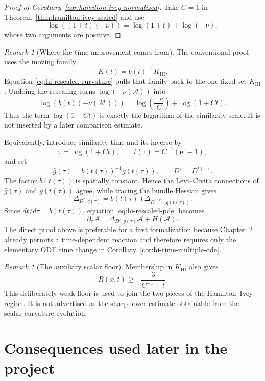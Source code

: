 \documentclass[10pt]{coll-l}
\theoremstyle{definition}
\theoremstyle{remark}
\newtheorem{remark}[theorem]{Remark}
\numberwithin{section}{chapter}
\numberwithin{equation}{chapter}
\begin{document}
\begin{proof}[Proof of Corollary~\ref{cor:hamilton-ivey-normalized}]
Take $C=1$ in Theorem~\ref{thm:hamilton-ivey-scaled} and use
\[
       \log((1+t)(-\nu))=\log(1+t)+\log(-\nu),
\]
whose two arguments are positive.
\end{proof}

\begin{remark}[Where the time improvement comes from]
\label{rem:hi-source-time-term}
The conventional proof uses the moving family
\[
                  K(t)=b(t)^{-1}K_{\mathrm{HI}}.
\]
Equation \eqref{eq:hi-rescaled-curvature} pulls that family back to the one
fixed set $K_{\mathrm{HI}}$.  Undoing the rescaling turns
$\log(-\nu(\mathcal A))$ into
\[
 \log\!\left(b(t)(-\nu(\mathcal M))\right)
   =\log\!\left(\frac{-\nu}{C}\right)+\log(1+Ct).
\]
Thus the term $\log(1+Ct)$ is exactly the logarithm of the similarity
scale.  It is not inserted by a later comparison estimate.

Equivalently, introduce similarity time and its inverse by
\[
 \tau=\log(1+Ct),\qquad
 t(\tau)=C^{-1}(\mathrm e^\tau-1),
\]
and set
\[
 \bar g(\tau)=b(t(\tau))^{-1}g(t(\tau)),
 \qquad D^\tau=D^{t(\tau)}.
\]
The factor $b(t(\tau))$ is spatially constant.  Hence the Levi--Civita
connections of $\bar g(\tau)$ and $g(t(\tau))$ agree, while tracing the
bundle Hessian gives
\[
 \Delta_{D^\tau,\bar g(\tau)}
    =b(t(\tau))\Delta_{D^{t(\tau)},g(t(\tau))}.
\]
Since $dt/d\tau=b(t(\tau))$, equation
\eqref{eq:hi-rescaled-pde} becomes
\[
 \partial_\tau\mathcal A
    =\Delta_{D^\tau,\bar g(\tau)}\mathcal A+H(\mathcal A).
\]
The direct proof above is preferable for a first formalization because
Chapter~2 already permits a time-dependent reaction and therefore requires
only the elementary ODE time change in
Corollary~\ref{cor:hi-time-multiple-ode}.
\end{remark}

\begin{remark}[The auxiliary scalar floor]
\label{rem:hi-scalar-floor}
Membership in $K_{\mathrm{HI}}$ also gives
\[
                    R(x,t)\geq-\frac3{C^{-1}+t}.
\]
This deliberately weak floor is used to join the two pieces of the
Hamilton--Ivey region.  It is not advertised as the sharp lower estimate
obtainable from the scalar-curvature evolution.
\end{remark}

\section{Consequences used later in the project}
\label{sec:hi-consequences}
\end{document}
